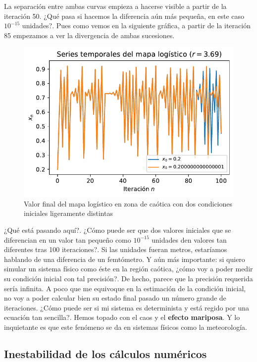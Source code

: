 \documentclass[
  10pt,
  a4paper,
  DIV=11,
  numbers=noendperiod,
  open=any]{scrreprt}
\numberwithin{equation}{chapter}
\numberwithin{equation}{section}
\renewcommand{\[}{\begin{equation}}
\renewcommand{\]}{\end{equation}}
\begin{document}
La separación entre ambas curvas empieza a hacerse visible a partir de
la iteración 50. ¿Qué pasa si hacemos la diferencia aún más pequeña, en
este caso \(10^{-15}\) unidades?. Pues como vemos en la siguiente
gráfica, a partir de la iteración 85 empezamos a ver la divergencia de
ambas sucesiones.

\begin{figure}[h]
  \centering
  \includegraphics[keepaspectratio]{01-logistica/lyapunov_files/figure-pdf/cell-7-output-1.pdf}
  \caption{Valor final del mapa logístico en zona de caótica con dos condiciones iniciales ligeramente distintas}
\end{figure}  


¿Qué está pasando aquí?. ¿Cómo puede ser que dos valores iniciales que
se diferencian en un valor tan pequeño como \(10^{-15}\) unidades den
valores tan diferentes tras 100 iteraciones?. Si las unidades fueran
metros, estaríamos hablando de una diferencia de un femtómetro. Y aún
más importante: si quiero simular un sistema físico como éste en la
región caótica, ¿cómo voy a poder medir su condición inicial con tal
precisión?. De hecho, parece que la precisión requerida sería infinita.
A poco que me equivoque en la estimación de la condición inicial, no voy
a poder calcular bien su estado final pasado un número grande de
iteraciones. ¿Cómo puede ser si mi sistema es determinista y está regido
por una ecuación tan sencilla?. Hemos topado con el caos y el
\textbf{efecto mariposa}. Y lo inquietante es que este fenómeno se da en
sistemas físicos como la meteorología.

\subsection{Inestabilidad de los cálculos
numéricos}\label{sec-inestabilidad}
\end{document}

